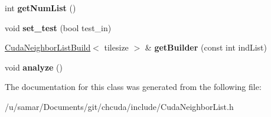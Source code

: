 \begin{DoxyCompactItemize}
\hypertarget{classCudaNeighborList_acf881a8245ab7e077122bda0ab57f9de}{}\label{classCudaNeighborList_acf881a8245ab7e077122bda0ab57f9de} 
int {\bfseries get\+Num\+List} ()
\item 
\hypertarget{classCudaNeighborList_a2158fc32438bb35d3b2170fb0ee36fed}{}\label{classCudaNeighborList_a2158fc32438bb35d3b2170fb0ee36fed} 
void {\bfseries set\+\_\+test} (bool test\+\_\+in)
\item 
\hypertarget{classCudaNeighborList_ac481b590ff46bd7bcf159c0655b9f080}{}\label{classCudaNeighborList_ac481b590ff46bd7bcf159c0655b9f080} 
\hyperlink{classCudaNeighborListBuild}{Cuda\+Neighbor\+List\+Build}$<$ tilesize $>$ \& {\bfseries get\+Builder} (const int ind\+List)
\item 
\hypertarget{classCudaNeighborList_a2b1c5d91c32e1628090998b9639320fa}{}\label{classCudaNeighborList_a2b1c5d91c32e1628090998b9639320fa} 
void {\bfseries analyze} ()
\end{DoxyCompactItemize}


The documentation for this class was generated from the following file\+:\begin{DoxyCompactItemize}
\item 
/u/samar/\+Documents/git/chcuda/include/Cuda\+Neighbor\+List.\+h\end{DoxyCompactItemize}
